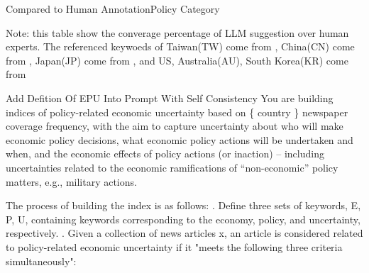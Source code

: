 \documentclass[12pt]{beamer}
\begin{document}
\begin{frame}{Compared to Human Annotation}{Policy Category}
\begin{table}[H]
\renewcommand\arraystretch{1.4}
\begin{adjustwidth}{-0.0cm}{}
\begin{center}
\setlength{\tabcolsep}{25pt}
{
    \fontsize{14}{14} \selectfont
    
}
\end{center}
\end{adjustwidth}
\begin{justify}
{\tiny
    Note: this table show the converage percentage of LLM suggestion over
    human experts. The referenced keywoeds of Taiwan(TW) come from
    \cite{Chen2024}, China(CN) come from \cite{Huang2020}, Japan(JP) come from
    \cite{ArbatliSaxegaard2022}, and US, Australia(AU), South Korea(KR) come
    from \cite{Baker2016}
}
\end{justify}
\end{table}
\end{frame}


\begin{frame}{Add Defition Of EPU Into Prompt With Self Consistency}
You are building indices of policy-related economic uncertainty based on
\{ country \} newspaper coverage frequency, with the aim to capture
uncertainty about who will make economic policy decisions, what economic policy
actions will be undertaken and when, and the economic effects of policy actions
(or inaction) – including uncertainties related to the economic ramifications
of “non-economic” policy matters, e.g., military actions.

The process of building the index is as follows: . Define three sets of keywords, E, P, U, containing keywords
    corresponding to the economy, policy, and uncertainty, respectively. . Given a collection of news articles x, an article is considered related to
    policy-related economic uncertainty if it "meets the following three
    criteria simultaneously":
\end{frame}
\end{document}
